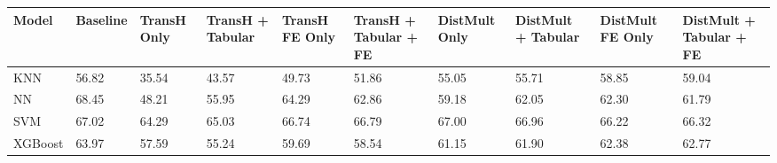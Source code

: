 \begin{tabular}{llllllllll}
\toprule
Model & Baseline & TransH Only & TransH + Tabular & TransH FE Only & TransH + Tabular + FE & DistMult Only & DistMult + Tabular & DistMult FE Only & DistMult + Tabular + FE \\
\midrule
KNN & 56.82 & 35.54 & 43.57 & 49.73 & 51.86 & 55.05 & 55.71 & 58.85 & 59.04 \\
NN & 68.45 & 48.21 & 55.95 & 64.29 & 62.86 & 59.18 & 62.05 & 62.30 & 61.79 \\
SVM & 67.02 & 64.29 & 65.03 & 66.74 & 66.79 & 67.00 & 66.96 & 66.22 & 66.32 \\
XGBoost & 63.97 & 57.59 & 55.24 & 59.69 & 58.54 & 61.15 & 61.90 & 62.38 & 62.77 \\
\bottomrule
\end{tabular}
